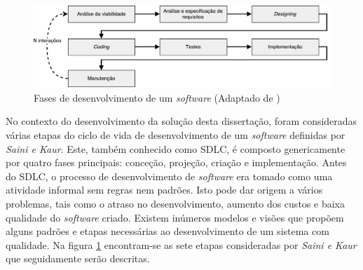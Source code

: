 \begin{figure}[!htb]
	\centering
	\includegraphics[scale=0.6]{esquemas/desenvolvimentoSW.pdf}
	\caption[Fases de desenvolvimento de um \textit{software} ]{Fases de desenvolvimento de um \textit{software} (Adaptado de \cite{Saini2014})}
	\label{sdlcartic}
\end{figure}


No contexto do desenvolvimento da solução desta dissertação, foram consideradas várias etapas do ciclo de vida de desenvolvimento de um \textit{software} definidas por  \textit{Saini e Kaur}\cite{Saini2014}. Este, também conhecido como \ac{SDLC}, é composto genericamente por quatro fases principais: conceção, projeção, criação e implementação. Antes do \ac{SDLC}, o processo de desenvolvimento de \textit{software} era tomado como uma atividade informal sem regras nem padrões. Isto pode dar  origem a vários problemas, tais como o atraso no desenvolvimento, aumento dos custos e baixa qualidade do \textit{software} criado. Existem inúmeros modelos e visões que propõem alguns padrões e etapas necessárias ao desenvolvimento de um sistema com qualidade. Na figura \ref{sdlcartic} encontram-se as sete etapas consideradas por \textit{Saini e Kaur}\cite{Saini2014} que seguidamente serão descritas. 









